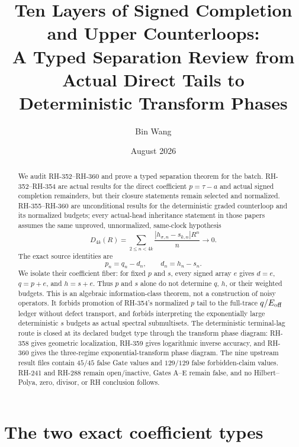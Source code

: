 \documentclass[11pt]{article}
\title{Ten Layers of Signed Completion and Upper Counterloops:\\
A Typed Separation Review from Actual Direct Tails to Deterministic Transform Phases}
\author{Bin Wang}
\date{August 2026}
\theoremstyle{definition}
\theoremstyle{remark}
\begin{document}
\maketitle

\begin{abstract}
We audit RH-352--RH-360 and prove a typed separation theorem for the batch.
RH-352--RH-354 are actual results for the direct coefficient
$p=\tau-a$ and actual signed completion remainders, but their closure
statements remain selected and normalized.  RH-355--RH-360 are unconditional
results for the deterministic graded counterloop and its normalized budgets;
every actual-head inheritance statement in those papers assumes the same
unproved, unnormalized, same-clock hypothesis
\[
 D_{4k}(R)=\sum_{2\le n<4k}
 \frac{|h_{\sigma,n}-s_{k,n}|R^n}{n}\longrightarrow0.
\]
The exact source identities are
\[
 p_n=q_n-d_n,\qquad d_n=h_n-s_n.
\]
We isolate their coefficient fiber: for fixed $p$ and $s$, every signed
array $e$ gives $d=e$, $q=p+e$, and $h=s+e$.  Thus $p$ and $s$ alone do not
determine $q$, $h$, or their weighted budgets.  This is an algebraic
information-class theorem, not a construction of noisy operators.  It
forbids promotion of RH-354's normalized $p$ tail to the full-trace
$q/E_{\rm off}$ ledger without defect transport, and forbids interpreting
the exponentially large deterministic $s$ budgets as actual spectral
submultisets.  The deterministic terminal-lag route is closed at its
declared budget type through the transform phase diagram:
RH-358 gives geometric localization, RH-359 gives logarithmic inverse
accuracy, and RH-360 gives the three-regime exponential-transform phase
diagram.  The nine upstream result files contain $45/45$ false Gate values
and $129/129$ false forbidden-claim values.  RH-241 and RH-288 remain
open/inactive, Gates A--E remain false, and no Hilbert--Polya, zero, divisor,
or RH conclusion follows.
\end{abstract}

\section{The two exact coefficient types}
\end{document}
